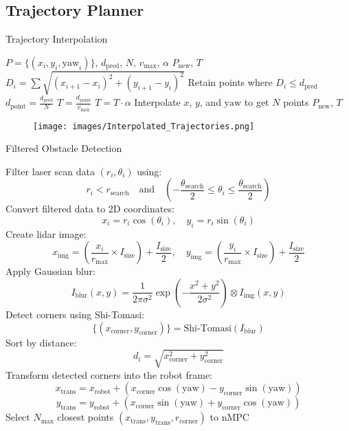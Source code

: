 \documentclass[conference]{IEEEtran}
\begin{document}
\subsection{Trajectory Planner}

\begin{algorithm}
\caption{Trajectory Interpolation}
\begin{algorithmic}[1]
\REQUIRE $P = \{(x_i, y_i, \text{yaw}_i)\}$, $d_{\text{pred}}$, $N$, $v_{\text{max}}$, $\alpha$
\ENSURE $P_{\text{new}}$, $T$
\STATE $D_i = \sum \sqrt{(x_{i+1} - x_i)^2 + (y_{i+1} - y_i)^2}$
\STATE Retain points where $D_i \leq d_{\text{pred}}$
\STATE $d_{\text{point}} = \frac{d_{\text{pred}}}{N}$
\STATE $T = \frac{d_{\text{point}}}{v_{\text{max}}}$
\STATE $T = T \cdot \alpha$
\STATE Interpolate $x$, $y$, and $\text{yaw}$ to get $N$ points
\RETURN $P_{\text{new}}$, $T$
\end{algorithmic}
\end{algorithm}




\begin{figure}[!h]
    \centering
    \texttt{[image: images/Interpolated\_Trajectories.png]}
    \caption{ }
    \label{fig:nMPC_16_vs_DWA_12_vs_TEB_6_Path}
\end{figure}


\begin{algorithm}
\caption{Filtered Obstacle Detection}
\begin{algorithmic}[1]
\STATE Filter laser scan data $(r_i, \theta_i)$ using:
\[
r_i < r_{\text{search}} \quad \text{and} \quad \left( -\frac{\theta_{\text{search}}}{2} \leq \theta_i \leq \frac{\theta_{\text{search}}}{2} \right)
\]
\STATE Convert filtered data to 2D coordinates:
\[
x_i = r_i \cos(\theta_i), \quad y_i = r_i \sin(\theta_i)
\]
\STATE Create lidar image:
\[
x_{\text{img}} = \left( \frac{x_i}{r_{\text{max}}} \times I_{\text{size}} \right) + \frac{I_{\text{size}}}{2}, \quad y_{\text{img}} = \left( \frac{y_i}{r_{\text{max}}} \times I_{\text{size}} \right) + \frac{I_{\text{size}}}{2}
\]
\STATE Apply Gaussian blur:
\[
I_{\text{blur}}(x, y) = \frac{1}{2\pi \sigma^2} \exp\left(-\frac{x^2 + y^2}{2\sigma^2}\right) \otimes I_{\text{img}}(x, y)
\]
\STATE Detect corners using Shi-Tomasi:
\[
\{(x_{\text{corner}}, y_{\text{corner}})\} = \text{Shi-Tomasi}(I_{\text{blur}})
\]
\STATE Sort by distance:
\[
d_i = \sqrt{x_{\text{corner}}^2 + y_{\text{corner}}^2}
\]
\STATE Transform detected corners into the robot frame:
\[
x_{\text{trans}} = x_{\text{robot}} + (x_{\text{corner}} \cos(\text{yaw}) - y_{\text{corner}} \sin(\text{yaw}))
\]
\[
y_{\text{trans}} = y_{\text{robot}} + (x_{\text{corner}} \sin(\text{yaw}) + y_{\text{corner}} \cos(\text{yaw}))
\]
\STATE Select $N_{\text{max}}$ closest points
\RETURN $(x_{\text{trans}}, y_{\text{trans}}, r_{\text{corner}})$ to nMPC
\end{algorithmic}
\end{algorithm}
\end{document}
